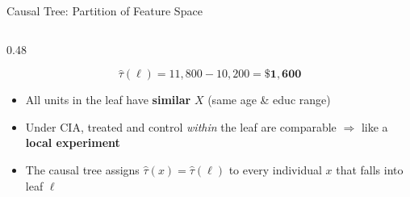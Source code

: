 \documentclass[hyperref={pdfpagelabels=false}]{beamer}
\begin{document}
\begin{frame}{Causal Tree: Partition of Feature Space}
\begin{columns}[T]
\begin{column}{0.48\textwidth}
\begin{itemize}
		\end{itemize}
		\begin{equation*}
			\hat{\tau}(\ell) = 11{,}800 - 10{,}200 = \mathbf{\$1{,}600}
		\end{equation*}
		\vspace{0.15cm}
		\begin{itemize}
			\item All units in the leaf have \textbf{similar} $X$ (same age \& educ range)
			\vspace{0.2cm}
			\item Under CIA, treated and control \textit{within} the leaf are comparable $\Rightarrow$ like a \textbf{local experiment}
			\vspace{0.2cm}
			\item The causal tree assigns $\hat{\tau}(x) = \hat{\tau}(\ell)$ to every individual $x$ that falls into leaf $\ell$
		\end{itemize}
	\end{column}
\end{columns}
\end{frame}
\end{document}
